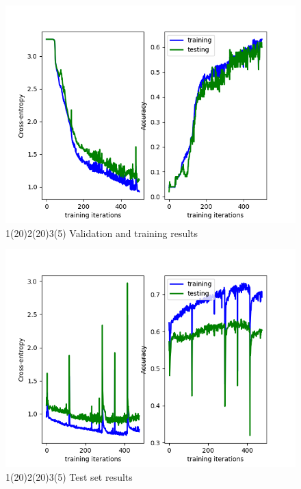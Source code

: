 \documentclass[a4paper]{report}
\begin{document}
\begin{figure}[h]
\begin{center}
\includegraphics[scale=0.5]{test-20-20-5-0,05.png}
\end{center}
\caption{1(20)2(20)3(5) Validation and training results}
\end{figure}
\begin{figure}[h]
\begin{center}
\includegraphics[scale=0.5]{testDeverdadlootroesval202050,05.png}
\end{center}
\caption{1(20)2(20)3(5) Test set results}
\end{figure}
\end{document}
